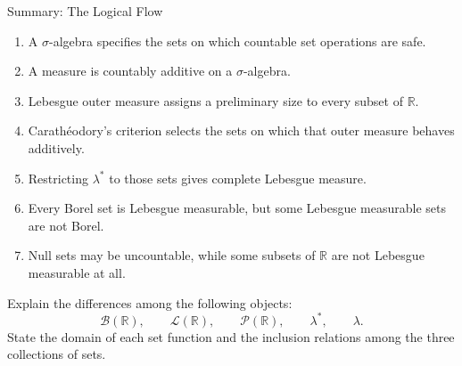 \documentclass[12pt,a4paper]{article}
\begin{document}
\clearpage

\begin{heading}
    Summary: The Logical Flow
\end{heading}

\vspace{10pt}

\begin{enumerate}
    \item A $\sigma$-algebra specifies the sets on which countable set operations are safe.
    \item A measure is countably additive on a $\sigma$-algebra.
    \item Lebesgue outer measure assigns a preliminary size to every subset of $\mathbb{R}$.
    \item Carath\'eodory's criterion selects the sets on which that outer measure behaves additively.
    \item Restricting $\lambda^*$ to those sets gives complete Lebesgue measure.
    \item Every Borel set is Lebesgue measurable, but some Lebesgue measurable sets are not Borel.
    \item Null sets may be uncountable, while some subsets of $\mathbb{R}$ are not Lebesgue measurable at all.
\end{enumerate}

\begin{problem}
    Explain the differences among the following objects:
    \[
        \mathcal{B}(\mathbb{R}),\qquad
        \mathcal{L}(\mathbb{R}),\qquad
        \mathcal{P}(\mathbb{R}),\qquad
        \lambda^*,\qquad
        \lambda.
    \]
    State the domain of each set function and the inclusion relations among the three collections of sets.
\end{problem}

\clearpage

\EndPage
\end{document}
